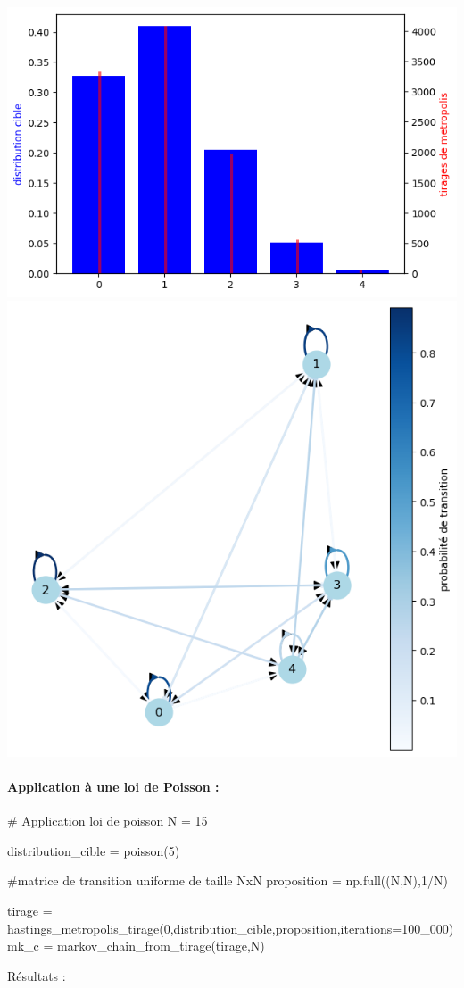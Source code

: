 \documentclass{article}
\begin{document}
\includegraphics[scale=0.25]{loi bin.png}
\includegraphics[scale=0.25]{loi bin graph.png}

\newpage
\paragraph{Application à une loi de Poisson :}
\begin{center}
\begin{python}
# Application loi de poisson
N = 15

distribution_cible = poisson(5)

#matrice de transition uniforme de taille NxN
proposition = np.full((N,N),1/N)

tirage = hastings_metropolis_tirage(0,distribution_cible,proposition,iterations=100_000)
mk_c = markov_chain_from_tirage(tirage,N)
\end{python}
\end{center}
Résultats :
\end{document}
